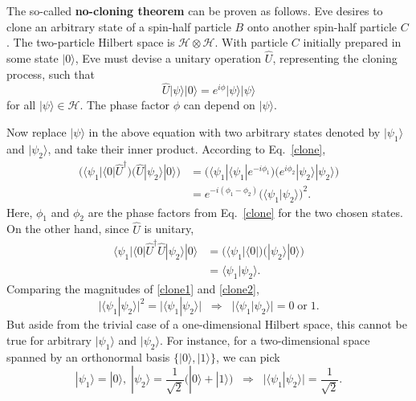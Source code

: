 \documentclass[pra,12pt]{revtex4-2}
\begin{document}
The so-called \textbf{no-cloning theorem} can be proven as follows.
Eve desires to clone an arbitrary state of a spin-half particle $B$
onto another spin-half particle $C$.  The two-particle Hilbert space
is $\mathscr{H}\otimes\mathscr{H}$.  With particle $C$ initially
prepared in some state $|0\rangle$, Eve must devise a unitary
operation $\hat{U}$, representing the cloning process, such that
\begin{equation}
  \hat{U} |\psi\rangle | 0\rangle = e^{i\phi} |\psi\rangle |\psi\rangle
  \label{clone}
\end{equation}
for all $|\psi\rangle \in \mathscr{H}$.  The phase factor $\phi$ can
depend on $|\psi\rangle$.

Now replace $|\psi\rangle$ in the above equation with two arbitrary
states denoted by $|\psi_1\rangle$ and $|\psi_2\rangle$, and take
their inner product.  According to Eq.~\eqref{clone},
\begin{align}
  \Big(\langle \psi_1 | \langle 0 | \hat{U}^\dagger \Big)
  \Big(\hat{U} | \psi_2 \rangle |0\rangle \Big)
  &=  \Big(\langle \psi_1| \langle \psi_1| e^{-i\phi_1} \Big) \Big( e^{i\phi_2} |\psi_2\rangle|\psi_2\rangle\Big) \\
  &= e^{-i(\phi_1-\phi_2)} \Big( \langle\psi_1 | \psi_2\rangle \Big)^2. \label{clone1}
\end{align}
Here, $\phi_1$ and $\phi_2$ are the phase factors from
Eq.~\eqref{clone} for the two chosen states.  On the other hand, since
$\hat{U}$ is unitary,
\begin{align}
  \langle \psi_1 | \langle 0 | \hat{U}^\dagger \hat{U} | \psi_2 \rangle |0\rangle
  &= \Big(\langle \psi_1 | \langle 0| \Big) \Big(| \psi_2 \rangle |0\rangle\Big)
  \\ &= \langle\psi_1 | \psi_2\rangle. \label{clone2}
\end{align}
Comparing the magnitudes of \eqref{clone1} and \eqref{clone2},
\begin{equation}
  \big|\langle \psi_1 | \psi_2\rangle \big|^2
  = \big| \langle\psi_1 | \psi_2\rangle \big|
  \;\;\Rightarrow \;\;
  \big|\langle\psi_1 | \psi_2\rangle\big| = 0 \;\mathrm{or}\; 1.
\end{equation}
But aside from the trivial case of a one-dimensional Hilbert space,
this cannot be true for arbitrary $|\psi_1\rangle$ and
$|\psi_2\rangle$.  For instance, for a two-dimensional space spanned
by an orthonormal basis $\{|0\rangle, |1\rangle\}$, we can pick
\begin{equation}
  |\psi_1\rangle = |0\rangle, \;
  |\psi_2\rangle = \frac{1}{\sqrt{2}}\big(|0\rangle +
  |1\rangle\big)
  \;\;\Rightarrow\;\;
  \big|\langle\psi_1|\psi_2\rangle\big| = \frac{1}{\sqrt{2}}.
\end{equation}
\end{document}
